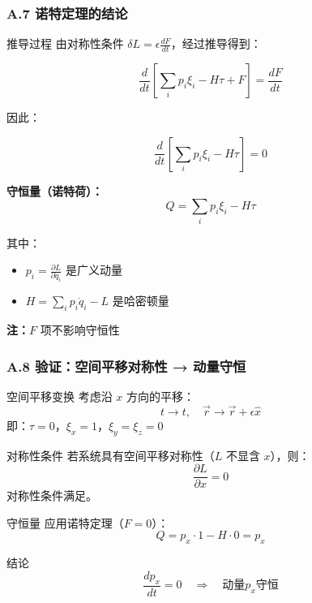 \documentclass[xcolor=dvipsnames]{ctexbeamer}
\begin{document}
\begin{frame}
\frametitle{A.7 诺特定理的结论}
\begin{block}{推导过程}
由对称性条件 $\delta L = \epsilon \frac{dF}{dt}$，经过推导得到：

$$\frac{d}{dt}\left[\sum_i p_i\xi_i - H\tau + F\right] = \frac{dF}{dt}$$

因此：

$$\boxed{\frac{d}{dt}\left[\sum_i p_i\xi_i - H\tau\right] = 0}$$
\end{block}

\pause

\begin{theorem}[诺特定理]
\textbf{守恒量（诺特荷）：}
$$\boxed{Q = \sum_i p_i\xi_i - H\tau}$$

其中：
\begin{itemize}
\item $p_i = \frac{\partial L}{\partial \dot{q}_i}$ 是广义动量
\item $H = \sum_i p_i\dot{q}_i - L$ 是哈密顿量
\end{itemize}

\textbf{注：}$F$ 项不影响守恒性
\end{theorem}
\end{frame}

\begin{frame}
\frametitle{A.8 验证：空间平移对称性 → 动量守恒}
\begin{block}{空间平移变换}
考虑沿 $x$ 方向的平移：
$$t \to t, \quad \vec{r} \to \vec{r} + \epsilon\hat{x}$$
即：$\tau = 0$，$\xi_x = 1$，$\xi_y = \xi_z = 0$
\end{block}

\pause

\begin{block}{对称性条件}
若系统具有空间平移对称性（$L$ 不显含 $x$），则：
$$\frac{\partial L}{\partial x} = 0$$
对称性条件满足。
\end{block}

\pause

\begin{block}{守恒量}
应用诺特定理（$F=0$）：
$$Q = p_x \cdot 1 - H \cdot 0 = p_x$$
\end{block}

\pause

\begin{alertblock}{结论}
$$\boxed{\frac{dp_x}{dt} = 0 \quad \Rightarrow \quad \text{动量} p_x \text{守恒}}$$
\end{alertblock}
\end{frame}
\end{document}
